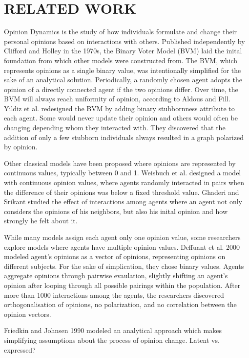 
\section{RELATED WORK}

Opinion Dynamics is the study of how individuals formulate and change their personal 
opinions based on interactions with others. Published independently by Clifford and 
Holley in the 1970s, the Binary Voter Model (BVM) laid the inital foundation from 
which other models were constructed from. The BVM, which represents opinions as a 
single binary value, was intentionally simplified for the sake of an analytical 
solution. Periodically, a randomly chosen agent adopts the opinion of a directly 
connected agent if the two opinions differ. Over time, the BVM will always reach 
uniformity of opinion, according to Aldous and Fill. Yildiz et al. redesigned the
BVM by adding binary stubbornness attribute to each agent. Some would never update
their opinion and others would often be changing depending whom they interacted with.
They discovered that the addition of only a few stubborn individuals always resulted 
in a graph polarized by opinion.

Other classical models have been proposed where opinions are represented by continuous 
values, typically between 0 and 1. Weisbuch et al. designed a model with continuous
opinion values, where agents randomly interacted in pairs when the difference of their 
opinions was below a fixed threshold value. Ghaderi and Srikant studied the effect of
interactions among agents where an agent not only considers the opinions of his 
neighbors, but also his inital opinion and how strongly he felt about it.

While many models assign each agent only one opinion value, some researchers explore 
models where agents have multiple opinion values. Deffuant et al. 2000 modeled agent's
opinions as a vector of opinions, representing opinions on different subjects. For the
sake of simplication, they chose binary values. Agents aggregate opinions through
pairwise evaulation, slightly shifting an agent's opinion after looping through all 
possible pairings within the population. After more than 1000 interactions among
the agents, the researchers discovered orthogonalisation of opinions, no polarization, 
and no correlation between the opinion vectors.

Friedkin and Johnsen 1990 modeled an analytical approach which makes simplifying 
assumptions about the process of opinion change. Latent vs. expressed?

